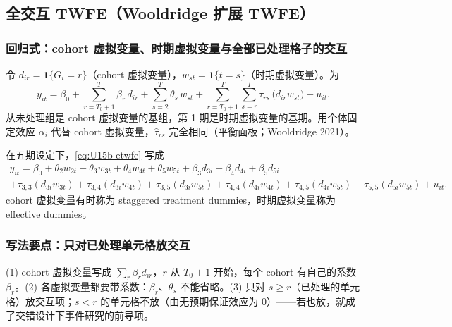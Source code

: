 \subsection{全交互 TWFE（Wooldridge 扩展 TWFE）}

\subsubsection{回归式：cohort 虚拟变量、时期虚拟变量与全部已处理格子的交互}

\begin{defn}\label{def:U15b-etwfe}
令 $d_{ir}=\mathbf{1}\{G_i=r\}$（cohort 虚拟变量），$w_{st}=\mathbf{1}\{t=s\}$（时期虚拟变量）。为
\begin{equation}\label{eq:U15b-etwfe}
y_{it}=\beta_0+\sum_{r=T_0+1}^{T}\beta_r\,d_{ir}+\sum_{s=2}^{T}\theta_s\,w_{st}+\sum_{r=T_0+1}^{T}\sum_{s=r}^{T}\tau_{rs}\,\bigl(d_{ir}w_{st}\bigr)+u_{it}.
\end{equation}
从未处理组是 cohort 虚拟变量的基组，第 1 期是时期虚拟变量的基期。用个体固定效应 $\alpha_i$ 代替 cohort 虚拟变量，$\hat\tau_{rs}$ 完全相同（平衡面板；Wooldridge 2021）。
\end{defn}

在五期设定下，\eqref{eq:U15b-etwfe} 写成
\begin{multline*}
y_{it}=\beta_0+\theta_2w_{2t}+\theta_3w_{3t}+\theta_4w_{4t}+\theta_5w_{5t}+\beta_3d_{3i}+\beta_4d_{4i}+\beta_5d_{5i}\\
+\tau_{3,3}(d_{3i}w_{3t})+\tau_{3,4}(d_{3i}w_{4t})+\tau_{3,5}(d_{3i}w_{5t})+\tau_{4,4}(d_{4i}w_{4t})+\tau_{4,5}(d_{4i}w_{5t})+\tau_{5,5}(d_{5i}w_{5t})+u_{it}.
\end{multline*}
cohort 虚拟变量有时称为 staggered treatment dummies，时期虚拟变量称为 effective dummies。

\subsubsection{写法要点：只对已处理单元格放交互}

\begin{note}
(1) cohort 虚拟变量写成 $\sum_r\beta_rd_{ir}$，$r$ 从 $T_0+1$ 开始，每个 cohort 有自己的系数 $\beta_r$。(2) 各虚拟变量都要带系数：$\beta_r$、$\theta_s$ 不能省略。(3) 只对 $s\ge r$（已处理的单元格）放交互项；$s<r$ 的单元格不放（由无预期保证效应为 0）——若也放，就成了交错设计下事件研究的前导项。
\end{note}

